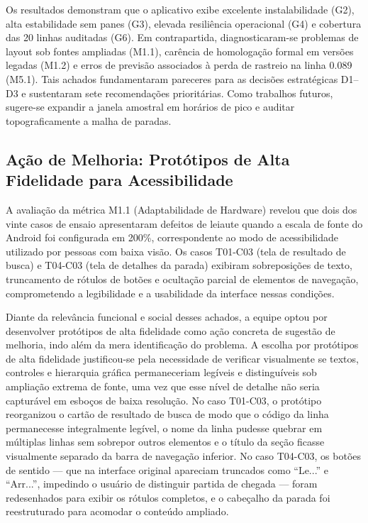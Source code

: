 \documentclass[11pt,a4paper]{article}
\begin{document}
Os resultados demonstram que o aplicativo exibe excelente instalabilidade (G2), alta estabilidade sem panes (G3), elevada resiliência operacional (G4) e cobertura das 20 linhas auditadas (G6). Em contrapartida, diagnosticaram-se problemas de layout sob fontes ampliadas (M1.1), carência de homologação formal em versões legadas (M1.2) e erros de previsão associados à perda de rastreio na linha 0.089 (M5.1). Tais achados fundamentaram pareceres para as decisões estratégicas D1--D3 e sustentaram sete recomendações prioritárias. Como trabalhos futuros, sugere-se expandir a janela amostral em horários de pico e auditar topograficamente a malha de paradas.

\subsection{Ação de Melhoria: Protótipos de Alta Fidelidade para Acessibilidade}
\label{sec:acao_melhoria}

A avaliação da métrica M1.1 (Adaptabilidade de Hardware) revelou que dois dos vinte casos de ensaio apresentaram defeitos de leiaute quando a escala de fonte do Android foi configurada em 200\%, correspondente ao modo de acessibilidade utilizado por pessoas com baixa visão. Os casos T01-C03 (tela de resultado de busca) e T04-C03 (tela de detalhes da parada) exibiram sobreposições de texto, truncamento de rótulos de botões e ocultação parcial de elementos de navegação, comprometendo a legibilidade e a usabilidade da interface nessas condições.

Diante da relevância funcional e social desses achados, a equipe optou por desenvolver protótipos de alta fidelidade como ação concreta de sugestão de melhoria, indo além da mera identificação do problema. A escolha por protótipos de alta fidelidade justificou-se pela necessidade de verificar visualmente se textos, controles e hierarquia gráfica permaneceriam legíveis e distinguíveis sob ampliação extrema de fonte, uma vez que esse nível de detalhe não seria capturável em esboços de baixa resolução. No caso T01-C03, o protótipo reorganizou o cartão de resultado de busca de modo que o código da linha permanecesse integralmente legível, o nome da linha pudesse quebrar em múltiplas linhas sem sobrepor outros elementos e o título da seção ficasse visualmente separado da barra de navegação inferior. No caso T04-C03, os botões de sentido --- que na interface original apareciam truncados como ``Le...'' e ``Arr...'', impedindo o usuário de distinguir partida de chegada --- foram redesenhados para exibir os rótulos completos, e o cabeçalho da parada foi reestruturado para acomodar o conteúdo ampliado.
\end{document}
